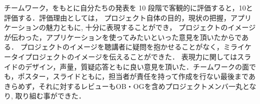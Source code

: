 チームワーク，をもとに自分たちの発表を 10 段階で客観的に評価すると，10と評価する．評価理由としては，
プロジェクト自体の目的，現状の把握，アプリケーションの魅力ともに, 十分に表現することができ，
プロジェクトのイメージが伝わった，アプリケーションを使ってみたいといった意見を頂いたからである．
プロジェクトのイメージを聴講者に疑問を抱かせることがなく，ミライケータイプロジェクトのイメージを伝えることができた．
表現力に関してはスライドのデザイン，声量，質疑応答ともに良い意見を頂いた．チームワークの面でも，ポスター，スライドともに，担当者が責任を持って作成を行ない最後まであきらめず，それに対するレビューもOB・OGを含めプロジェクトメンバ一丸となり, 取り組む事ができた．

